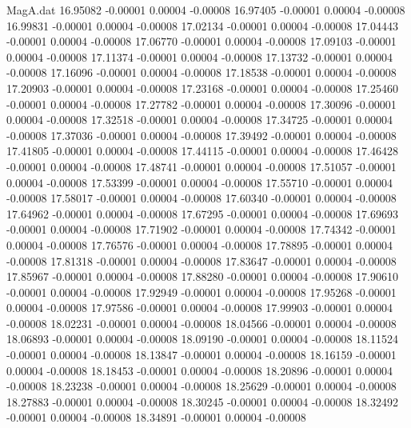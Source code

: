 \begin{filecontents}{MagA.dat}
  16.95082   -0.00001    0.00004   -0.00008
  16.97405   -0.00001    0.00004   -0.00008
  16.99831   -0.00001    0.00004   -0.00008
  17.02134   -0.00001    0.00004   -0.00008
  17.04443   -0.00001    0.00004   -0.00008
  17.06770   -0.00001    0.00004   -0.00008
  17.09103   -0.00001    0.00004   -0.00008
  17.11374   -0.00001    0.00004   -0.00008
  17.13732   -0.00001    0.00004   -0.00008
  17.16096   -0.00001    0.00004   -0.00008
  17.18538   -0.00001    0.00004   -0.00008
  17.20903   -0.00001    0.00004   -0.00008
  17.23168   -0.00001    0.00004   -0.00008
  17.25460   -0.00001    0.00004   -0.00008
  17.27782   -0.00001    0.00004   -0.00008
  17.30096   -0.00001    0.00004   -0.00008
  17.32518   -0.00001    0.00004   -0.00008
  17.34725   -0.00001    0.00004   -0.00008
  17.37036   -0.00001    0.00004   -0.00008
  17.39492   -0.00001    0.00004   -0.00008
  17.41805   -0.00001    0.00004   -0.00008
  17.44115   -0.00001    0.00004   -0.00008
  17.46428   -0.00001    0.00004   -0.00008
  17.48741   -0.00001    0.00004   -0.00008
  17.51057   -0.00001    0.00004   -0.00008
  17.53399   -0.00001    0.00004   -0.00008
  17.55710   -0.00001    0.00004   -0.00008
  17.58017   -0.00001    0.00004   -0.00008
  17.60340   -0.00001    0.00004   -0.00008
  17.64962   -0.00001    0.00004   -0.00008
  17.67295   -0.00001    0.00004   -0.00008
  17.69693   -0.00001    0.00004   -0.00008
  17.71902   -0.00001    0.00004   -0.00008
  17.74342   -0.00001    0.00004   -0.00008
  17.76576   -0.00001    0.00004   -0.00008
  17.78895   -0.00001    0.00004   -0.00008
  17.81318   -0.00001    0.00004   -0.00008
  17.83647   -0.00001    0.00004   -0.00008
  17.85967   -0.00001    0.00004   -0.00008
  17.88280   -0.00001    0.00004   -0.00008
  17.90610   -0.00001    0.00004   -0.00008
  17.92949   -0.00001    0.00004   -0.00008
  17.95268   -0.00001    0.00004   -0.00008
  17.97586   -0.00001    0.00004   -0.00008
  17.99903   -0.00001    0.00004   -0.00008
  18.02231   -0.00001    0.00004   -0.00008
  18.04566   -0.00001    0.00004   -0.00008
  18.06893   -0.00001    0.00004   -0.00008
  18.09190   -0.00001    0.00004   -0.00008
  18.11524   -0.00001    0.00004   -0.00008
  18.13847   -0.00001    0.00004   -0.00008
  18.16159   -0.00001    0.00004   -0.00008
  18.18453   -0.00001    0.00004   -0.00008
  18.20896   -0.00001    0.00004   -0.00008
  18.23238   -0.00001    0.00004   -0.00008
  18.25629   -0.00001    0.00004   -0.00008
  18.27883   -0.00001    0.00004   -0.00008
  18.30245   -0.00001    0.00004   -0.00008
  18.32492   -0.00001    0.00004   -0.00008
  18.34891   -0.00001    0.00004   -0.00008

\end{filecontents}
